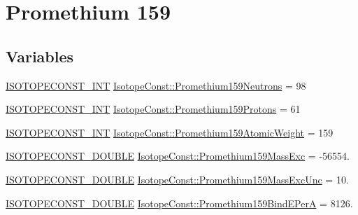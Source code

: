\hypertarget{group___isotope_const-_promethium-_pm159}{}\section{Promethium 159}
\label{group___isotope_const-_promethium-_pm159}
\subsection*{Variables}
\begin{DoxyCompactItemize}
\item 
\mbox{\hyperlink{group___isotope_const-_macros_ga5f18360b3e99483a35c32d789e62621c}{I\+S\+O\+T\+O\+P\+E\+C\+O\+N\+S\+T\+\_\+\+I\+NT}} \mbox{\hyperlink{group___isotope_const-_promethium-_pm159_ga6194f8ebd2f4954236816671ea685a3f}{Isotope\+Const\+::\+Promethium159\+Neutrons}} = 98
\item 
\mbox{\hyperlink{group___isotope_const-_macros_ga5f18360b3e99483a35c32d789e62621c}{I\+S\+O\+T\+O\+P\+E\+C\+O\+N\+S\+T\+\_\+\+I\+NT}} \mbox{\hyperlink{group___isotope_const-_promethium-_pm159_ga4ee14a762a17dd26e6ff61cfe0f90a5a}{Isotope\+Const\+::\+Promethium159\+Protons}} = 61
\item 
\mbox{\hyperlink{group___isotope_const-_macros_ga5f18360b3e99483a35c32d789e62621c}{I\+S\+O\+T\+O\+P\+E\+C\+O\+N\+S\+T\+\_\+\+I\+NT}} \mbox{\hyperlink{group___isotope_const-_promethium-_pm159_ga02a81af232c0c63993896d05eb91ce6d}{Isotope\+Const\+::\+Promethium159\+Atomic\+Weight}} = 159
\item 
\mbox{\hyperlink{group___isotope_const-_macros_ga8f45a7272ce02c0b4c65c44636ed719a}{I\+S\+O\+T\+O\+P\+E\+C\+O\+N\+S\+T\+\_\+\+D\+O\+U\+B\+LE}} \mbox{\hyperlink{group___isotope_const-_promethium-_pm159_ga0db2b8c1d0f9290cad7ff395f56326e4}{Isotope\+Const\+::\+Promethium159\+Mass\+Exc}} = -\/56554.
\item 
\mbox{\hyperlink{group___isotope_const-_macros_ga8f45a7272ce02c0b4c65c44636ed719a}{I\+S\+O\+T\+O\+P\+E\+C\+O\+N\+S\+T\+\_\+\+D\+O\+U\+B\+LE}} \mbox{\hyperlink{group___isotope_const-_promethium-_pm159_ga1c462119a9f7708f566fb8e2740a0286}{Isotope\+Const\+::\+Promethium159\+Mass\+Exc\+Unc}} = 10.
\item 
\mbox{\hyperlink{group___isotope_const-_macros_ga8f45a7272ce02c0b4c65c44636ed719a}{I\+S\+O\+T\+O\+P\+E\+C\+O\+N\+S\+T\+\_\+\+D\+O\+U\+B\+LE}} \mbox{\hyperlink{group___isotope_const-_promethium-_pm159_ga5de9a44bc2d2268b2b417fabdf8dcc10}{Isotope\+Const\+::\+Promethium159\+Bind\+E\+PerA}} = 8126.

\end{DoxyCompactItemize}
